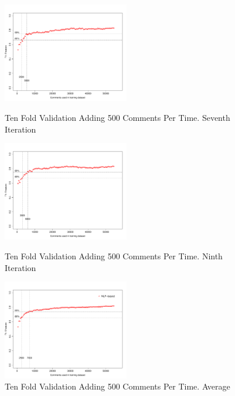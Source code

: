 \clearpage
\begin{figure}[thb!]
  \centering
  \vspace{-3mm}
  \includegraphics[width=0.49\textwidth]{figures/appendix/ten_fold_validation_design/ten_fold_validation_6_500.pdf}
  \vspace{-5mm}
  \caption{Ten Fold Validation Adding 500 Comments Per Time. Seventh Iteration}
  \label{fig:design_ten_fold_validation_6_100}
  \includegraphics[width=0.49\textwidth]{figures/appendix/ten_fold_validation_design/ten_fold_validation_8_500.pdf}
  \vspace{-5mm}
  \caption{Ten Fold Validation Adding 500 Comments Per Time. Ninth Iteration}
  \label{fig:design_ten_fold_validation_8_100}
  \includegraphics[width=0.49\textwidth]{figures/appendix/ten_fold_validation_design/ten_fold_validation_average_500.pdf}
  \vspace{-5mm}
  \caption{Ten Fold Validation Adding 500 Comments Per Time. Average}
  \label{fig:design_ten_fold_validation_average_100}
\end{figure}


